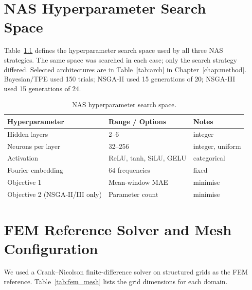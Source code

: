 \appendix

\chapter{NAS Hyperparameter Search Space}
\label{app:nas_space}

Table~\ref{tab:nas_space} defines the hyperparameter search space used by all
three NAS strategies.
The same space was searched in each case; only the search strategy differed.
Selected architectures are in Table~\ref{tab:arch} in Chapter~\ref{chap:method}.
Bayesian/TPE used 150 trials; NSGA-II used 15 generations of 20; NSGA-III
used 15 generations of 24.

\begin{table}[H]
\centering
\caption{NAS hyperparameter search space.}
\label{tab:nas_space}
\small
\begin{tabular}{lll}
\toprule
Hyperparameter & Range / Options & Notes \\
\midrule
Hidden layers     & 2--6                  & integer \\
Neurons per layer & 32--256               & integer, uniform \\
Activation        & ReLU, tanh, SiLU, GELU & categorical \\
Fourier embedding & 64 frequencies        & fixed \\
\midrule
Objective 1                    & Mean-window MAE & minimise \\
Objective 2 (NSGA-II/III only) & Parameter count & minimise \\
\bottomrule
\end{tabular}
\end{table}

\chapter{FEM Reference Solver and Mesh Configuration}
\label{app:fem_config}

We used a Crank--Nicolson finite-difference solver on structured grids as the
FEM reference.
Table~\ref{tab:fem_mesh} lists the grid dimensions for each domain.

